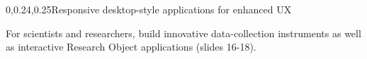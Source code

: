 \begin{frame}{}
{\begin{center}
\begin{minipage}{.9\textwidth}
{\begin{minipage}{\textwidth}
\begin{lightquadblockc}{0,0.24,0.25}{Responsive desktop-style applications for enhanced UX}
\begin{itemize}
\sqitem   {\lsep} \parbox[t]{17cm}{For scientists and researchers, 
build innovative data-collection instruments 
as well as interactive Research Object applications 
(slides 16-18).}\vspace{1.5em}
\end{itemize} 
\end{lightquadblockc}
\end{minipage}}

\end{minipage}
\end{center}
}

\end{frame}
